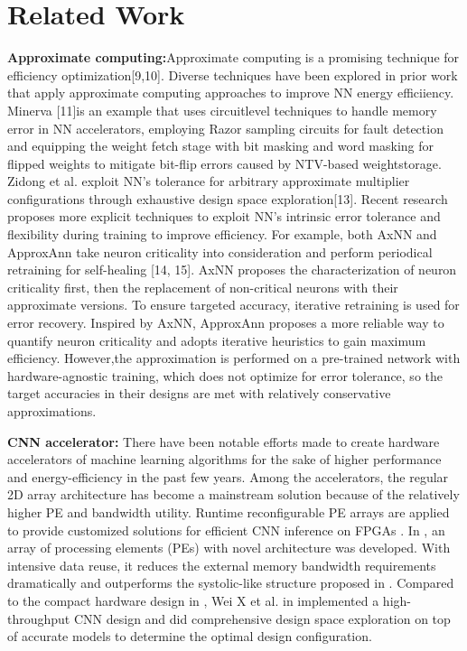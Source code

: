 \section{Related Work} \label{sec:relatedwork}
\textbf{Approximate computing:}Approximate computing is a promising technique for efficiency optimization[9,10].
Diverse techniques have been explored in prior work that apply approximate computing approaches to improve NN energy efficiiency.
Minerva [11]is an example that uses circuitlevel techniques to handle memory error in NN accelerators,
employing Razor sampling circuits for fault detection and equipping the weight fetch stage with bit masking and word
masking for flipped weights to mitigate bit-flip errors caused by NTV-based weightstorage.
Zidong et al. exploit NN’s tolerance for arbitrary approximate multiplier configurations through exhaustive design space exploration[13].
Recent research proposes more explicit techniques to exploit NN’s intrinsic error tolerance and flexibility
during training to improve efficiency. For example, both AxNN and ApproxAnn take neuron criticality into
consideration and perform periodical retraining for self-healing [14, 15]. AxNN proposes the characterization
of neuron criticality first, then the replacement of non-critical neurons with their approximate versions.
To ensure targeted accuracy, iterative retraining is used for error recovery. Inspired by AxNN,
ApproxAnn proposes a more reliable way to quantify neuron criticality and adopts iterative heuristics to gain maximum efficiency.
However,the approximation is performed on a pre-trained network with hardware-agnostic training, which does not optimize
for error tolerance, so the target accuracies in their designs are met with relatively conservative approximations.

\textbf{CNN accelerator:} There have been notable efforts made to create hardware accelerators of 
machine learning algorithms for the sake of higher performance and energy-efficiency \cite{Cnvlutin_25} 
in the past few years. Among the accelerators, the regular 2D array architecture has become 
a mainstream solution because of the relatively higher PE and bandwidth utility. Runtime reconfigurable 
PE arrays are applied to provide customized solutions for efficient CNN inference on FPGAs \cite{Caffeine_6,deepburing_12}. 
In \cite{Aydonat_27}, an array of processing elements (PEs) with novel architecture was developed. With intensive 
data reuse, it reduces the external memory bandwidth requirements dramatically and outperforms 
the systolic-like structure proposed in \cite{Caffeine_6}. Compared to the compact hardware design in \cite{Caffeine_6,Aydonat_27}, 
Wei X et al. in \cite{Wei_29} implemented a high-throughput CNN design and did comprehensive design space exploration 
on top of accurate models to determine the optimal design configuration.

